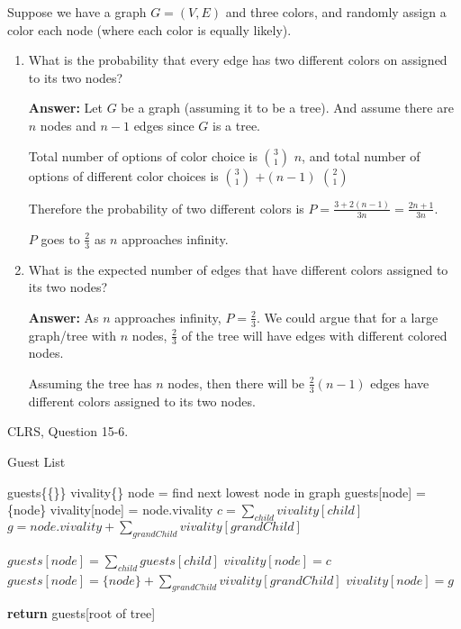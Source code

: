 \documentclass{article}
\begin{document}
\nextprob
Suppose we have a graph $G=(V,E)$ and three colors, and randomly assign a color
each node (where each color is equally likely).
\begin{enumerate}
   \item What is the probability that every edge has two different colors on
        assigned to its two nodes?
        
        \textbf{Answer:} Let $G$ be a graph (assuming it to be a tree). And assume there are $n$ nodes and $n-1$ edges since $G$ is a tree.
        
        Total number of options of color choice is $3\choose 1$ $n$, and total number of options of different color choices is $3\choose 1$ $+ (n-1) $ $2\choose 1$
        
        Therefore the probability of two different colors is $P = \frac{3+2(n-1)}{3n} = \frac{2n+1}{3n}$.
        
        $P$ goes to $\frac{2}{3}$ as $n$ approaches infinity.
               
    \item What is the expected number of edges that have different colors
        assigned to its two nodes?
        
        \textbf{Answer:} As $n$ approaches infinity, $P=\frac{2}{3}$. We could argue that for a large graph/tree with $n$ nodes,  $\frac{2}{3}$ of the tree will have edges with different colored nodes. 
        
        Assuming the tree has $n$ nodes, then there will be $\frac{2}{3} (n-1)$ edges have different colors assigned to its two nodes.
        
\end{enumerate}

\nextprob
CLRS, Question 15-6.

\begin{algorithm}
    \caption{Guest List}\label{guests}
    \begin{algorithmic}[1]
        \State guests\{\{\}\}
        \State vivality\{\}
			\State node = find next lowest node in graph
				\State guests[node] = \{node\}
				\State vivality[node] = node.vivality
			\Else
				\State $c = \sum_{child} vivality[child]$
				\State $g = node.vivality + \sum_{grandChild} vivality[grandChild]$

					\State $guests[node] = \sum_{child} guests[child]$
					\State $vivality[node] = c$
				\Else
					\State $guests[node] = \{node\} + \sum_{grandChild} vivality[grandChild]$
					\State $vivality[node] = g$
				\EndIf
			\EndIf
		\EndFor

       \State \textbf{return} guests[root of tree]

    \EndFunction
    \end{algorithmic}
\end{algorithm}
\end{document}
